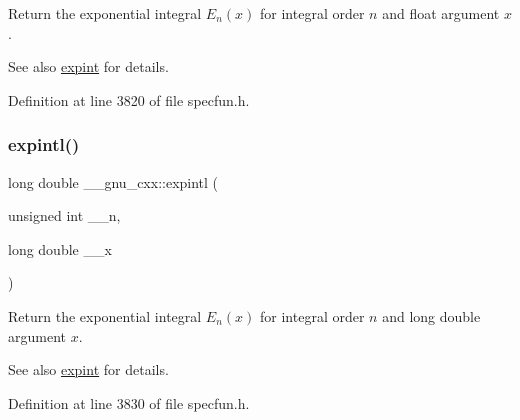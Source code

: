 Return the exponential integral $ E_n(x) $ for integral order $ n $ and {\ttfamily float} argument $ x $.

\begin{DoxySeeAlso}{See also}
\hyperlink{group__gnu__math__spec__func_gadaf9317953b826975da72d1858f01ea5}{expint} for details. 
\end{DoxySeeAlso}


Definition at line 3820 of file specfun.\+h.

\mbox{\label{group__gnu__math__spec__func_ga720ca0b275784c8b82193f427a2b3553}} 
\subsubsection{\texorpdfstring{expintl()}{expintl()}}
{\footnotesize\ttfamily long double \+\_\+\+\_\+gnu\+\_\+cxx\+::expintl (\begin{DoxyParamCaption}\item[{unsigned int}]{\+\_\+\+\_\+n,  }\item[{long double}]{\+\_\+\+\_\+x }\end{DoxyParamCaption})\hspace{0.3cm}{\ttfamily [inline]}}

Return the exponential integral $ E_n(x) $ for integral order $ n $ and {\ttfamily long double} argument $ x $.

\begin{DoxySeeAlso}{See also}
\hyperlink{group__gnu__math__spec__func_gadaf9317953b826975da72d1858f01ea5}{expint} for details. 
\end{DoxySeeAlso}


Definition at line 3830 of file specfun.\+h.

\mbox{\label{group__gnu__math__spec__func_gaa546f47f8ab943d2c10b56bec8a44079}} 
